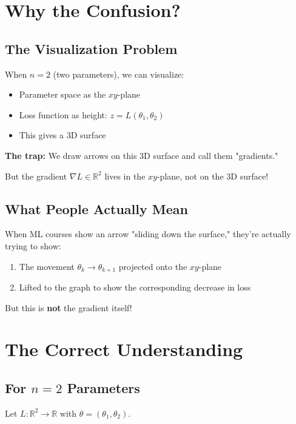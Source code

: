 \begin{notechapter}
\section{Why the Confusion?}

\subsection{The Visualization Problem}

When $n = 2$ (two parameters), we can visualize:
\begin{itemize}
    \item Parameter space as the $xy$-plane
    \item Loss function as height: $z = L(\theta_1, \theta_2)$
    \item This gives a 3D surface
\end{itemize}

\textbf{The trap:} We draw arrows on this 3D surface and call them "gradients."

But the gradient $\nabla L \in \mathbb{R}^2$ lives in the $xy$-plane, not on the 3D surface!

\subsection{What People Actually Mean}

When ML courses show an arrow "sliding down the surface," they're actually trying to show:

\begin{enumerate}
    \item The movement $\theta_k \to \theta_{k+1}$ projected onto the $xy$-plane
    \item Lifted to the graph to show the corresponding decrease in loss
\end{enumerate}

But this is \textbf{not} the gradient itself!

\section{The Correct Understanding}

\subsection{For $n = 2$ Parameters}

Let $L : \mathbb{R}^2 \to \mathbb{R}$ with $\theta = (\theta_1, \theta_2)$.


\end{notechapter}
